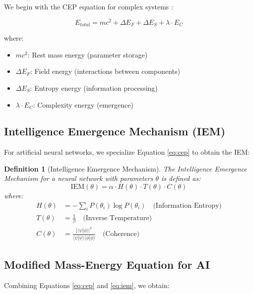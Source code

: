 \documentclass[12pt]{article}
\newtheorem{definition}{Definition}
\begin{document}
We begin with the CEP equation for complex systems \cite{chen2025cep}:

\begin{equation}
E_{total} = mc^2 + \Delta E_F + \Delta E_S + \lambda \cdot E_C
\label{eq:cep}
\end{equation}

where:
\begin{itemize}
\item $mc^2$: Rest mass energy (parameter storage)
\item $\Delta E_F$: Field energy (interactions between components)
\item $\Delta E_S$: Entropy energy (information processing)
\item $\lambda \cdot E_C$: Complexity energy (emergence)
\end{itemize}

\subsection{Intelligence Emergence Mechanism (IEM)}

For artificial neural networks, we specialize Equation \ref{eq:cep} to obtain the IEM:

\begin{definition}[Intelligence Emergence Mechanism]
The Intelligence Emergence Mechanism for a neural network with parameters $\theta$ is defined as:
\begin{equation}
\text{IEM}(\theta) = \alpha \cdot H(\theta) \cdot T(\theta) \cdot C(\theta)
\label{eq:iem}
\end{equation}
where:
\begin{align}
H(\theta) &= -\sum_{i} P(\theta_i) \log P(\theta_i) \quad \text{(Information Entropy)} \\
T(\theta) &= \frac{1}{\beta} \quad \text{(Inverse Temperature)} \\
C(\theta) &= \frac{|\langle \psi | \phi \rangle|^2}{\langle \psi | \psi \rangle \langle \phi | \phi \rangle} \quad \text{(Coherence)}
\end{align}
\end{definition}

\subsection{Modified Mass-Energy Equation for AI}

Combining Equations \ref{eq:cep} and \ref{eq:iem}, we obtain:
\end{document}
